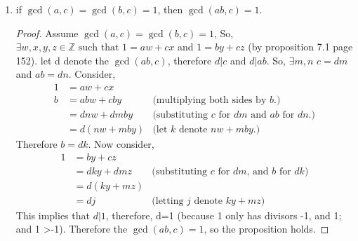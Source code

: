 \documentclass{article}
\newcommand{\Z}{\mathbb{Z}}
\newcommand{\st}{\text{ such that }}
\begin{document}
\begin{enumerate}
		
		\item if $\gcd(a,c)= \gcd(b,c)=1$, then $\gcd(ab,c)=1$.
		\begin{proof}
			Assume $\gcd(a,c)= \gcd(b,c)=1$, So, $\exists w, x, y, z  \in \Z \st 1= aw+ cx$ and $1= by + cz$ (by proposition 7.1 page 152).
			let d denote the $\gcd(ab,c)$, therefore $d|c$ and $d| ab$. So, $\exists m,n$ \st $c=dm$ and $ab =dn$. 
			Consider, 
			\begin{align*}
				1 &= aw+cx\\
				b &= abw+cby 	& \text{(multiplying both sides by $b$.)}\\
				  &= dnw+dmby 	& \text{(substituting $c$ for $dm$ and $ab$ for $dn$.)}\\
				  &= d(nw+mby) 	& \text{(let $k$ denote $nw+mby$.)}
			\end{align*}
			Therefore $b = dk$. Now consider,
			\begin{align*}
				1 &= by + cz \\
				  &= dky+ dmz & \text{(substituting $c$ for $dm$, and $b$ for $dk$)}\\
				  &= d(ky+mz) \\				  
				  &= dj 	  & \text{(letting $j$ denote $ky+mz$)}
			\end{align*}
			This implies that $d|1$, therefore, d=1 (because 1 only has divisors -1, and 1; and 1 >-1). Therefore the $\gcd(ab,c)=1$, so the proposition holds. 
		\end{proof}
	 
	\end{enumerate}
		
	
	
	
\end{document}
